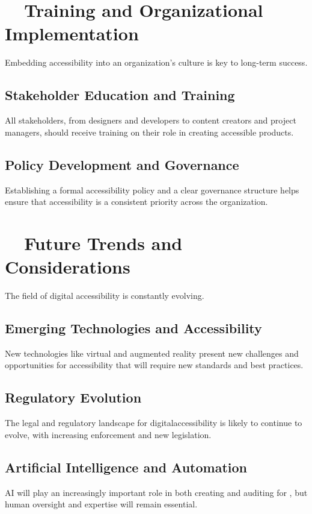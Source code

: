 \section{~~Training and Organizational Implementation}
\label{sec:training-implementation}
Embedding accessibility into an organization's culture is key to long-term success.

\subsection{Stakeholder Education and Training}
\label{subsec:stakeholder-training}
All stakeholders, from designers and developers to content creators and project managers, should receive training on their role in creating accessible products.
\supercite{PEATTraining}

\subsection{Policy Development and Governance}
\label{subsec:policy-governance}
Establishing a formal accessibility policy and a clear governance structure helps ensure that accessibility is a consistent priority across the organization.
\supercite{Lazar2015}

\section{~~Future Trends and Considerations}
\label{sec:future-trends}
The field of digital accessibility is constantly evolving.

\subsection{Emerging Technologies and Accessibility}
\label{subsec:emerging-tech-a11y}
New technologies like virtual and augmented reality present new challenges and opportunities for accessibility that will require new standards and best practices.
\supercite{W3CEmergingTechA11y}

\subsection{Regulatory Evolution}
\label{subsec:regulatory-evolution}
The legal and regulatory landscape for \gls{digitalaccessibility} is likely to continue to evolve, with increasing enforcement and new legislation.
\supercite{WCAG3Draft}

\subsection{Artificial Intelligence and Automation}
\label{subsec:ai-automation}
AI will play an increasingly important role in both creating and auditing for , but human oversight and expertise will remain essential.
\supercite{MicrosoftAIAccessibility, GoogleMLAccessibility}


